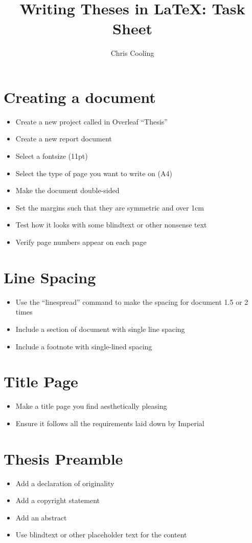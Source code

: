 \documentclass[11pt,a4paper]{article}
\begin{document}
\title{Writing Theses in \LaTeX: Task Sheet}
\author{Chris Cooling}
\maketitle
\pagestyle{empty}
\thispagestyle{empty}

\section{Creating a document}
\begin{itemize}
\item Create a new project called in Overleaf ``Thesis''
\item Create a new report document
\item Select a fontsize (11pt)
\item Select the type of page you want to write on (A4)
\item Make the document double-sided
\item Set the margins such that they are symmetric and over 1cm
\item Test how it looks with some blindtext or other nonsense text
\item Verify page numbers appear on each page
\end{itemize}

\section{Line Spacing}
\begin{itemize}
\item Use the ``linespread'' command to make the spacing for document 1.5 or 2 times
\item Include a section of document with single line spacing
\item Include a footnote with single-lined spacing
\end{itemize}

\section{Title Page}
\begin{itemize}
\item Make a title page you find aesthetically pleasing
\item Ensure it follows all the requirements laid down by Imperial
\end{itemize}

\section{Thesis Preamble}
\begin{itemize}
\item Add a declaration of originality
\item Add a copyright statement
\item Add an abstract
\item Use blindtext or other placeholder text for the content
\end{itemize}
\end{document}
